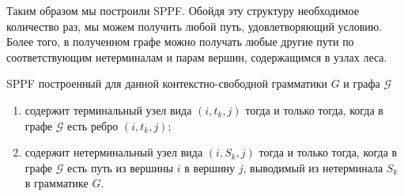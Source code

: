 \begin{example}
\begin{center}
{
    }
    \end{center}

    Таким образом мы построили SPPF. Обойдя эту структуру необходимое количество раз, мы можем получить любой путь, удовлетворяющий условию. Более того, в полученном графе можно получать любые другие пути по соответствующим нетерминалам и парам вершин, содержащимся в узлах леса.
    \end{example}

    SPPF построенный для данной контекстно-свободной грамматики $G$ и графа $\mathcal{G}$
    \begin{enumerate}
      \item содержит терминальный узел вида $(i,t_k,j)$ тогда и только тогда, когда в графе $\mathcal{G}$ есть ребро $(i,t_k,j)$;
      \item содержит нетерминальный узел вида $(i,S_k,j)$ тогда и только тогда, когда в графе $\mathcal{G}$ есть путь из вершины $i$ в вершину $j$, выводимый из нетерминала $S_k$ в грамматике $G$.
    \end{enumerate}

